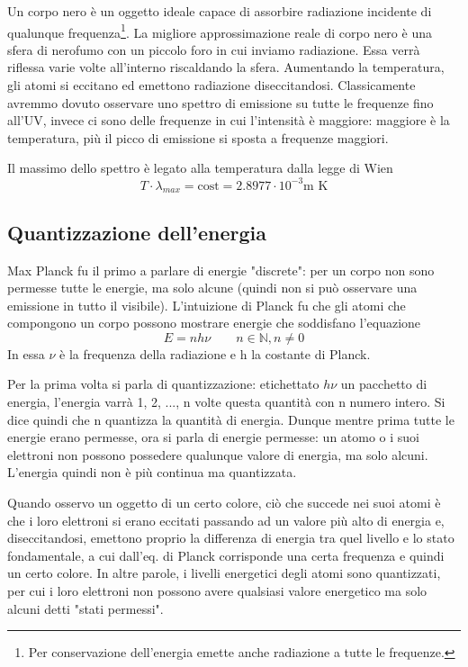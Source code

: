 Un corpo nero è un oggetto ideale capace di assorbire radiazione incidente di qualunque frequenza\footnote{Per conservazione dell'energia emette anche radiazione a tutte le frequenze.}. La migliore approssimazione reale di corpo nero è una sfera di nerofumo con un piccolo foro in cui inviamo radiazione. Essa verrà riflessa varie volte all'interno riscaldando la sfera. Aumentando la temperatura, gli atomi si eccitano ed emettono radiazione diseccitandosi. Classicamente avremmo dovuto osservare uno spettro di emissione su tutte le frequenze fino all'UV, invece ci sono delle frequenze in cui l'intensità è maggiore: maggiore è la temperatura, più il picco di emissione si sposta a frequenze maggiori. 

Il massimo dello spettro è legato alla temperatura dalla legge di Wien 
$$T\cdot\lambda_{max}= \text{cost}= 2.8977\cdot 10^{-3} \text{m K}$$


\subsection{Quantizzazione dell'energia}%
Max Planck fu il primo a parlare di energie "discrete": per un corpo non sono permesse tutte le energie, ma solo alcune (quindi non si può osservare una emissione in tutto il visibile).
L'intuizione di Planck fu che gli atomi che compongono un corpo possono mostrare energie che soddisfano l'equazione
$$E=nh\nu \qquad n\in\mathbb{N},n \neq 0 $$
In essa $\nu$ è la frequenza della radiazione e h la costante di Planck.

Per la prima volta si parla di quantizzazione: etichettato $h\nu$ un pacchetto di energia, l'energia varrà 1, 2, ..., n volte questa quantità con n numero intero. Si dice quindi che n quantizza la quantità di energia.
Dunque mentre prima tutte le energie erano permesse, ora si parla di energie permesse: un atomo o i suoi elettroni non possono possedere qualunque valore di energia, ma solo alcuni. L'energia quindi non è più continua ma quantizzata.

Quando osservo un oggetto di un certo colore, ciò che succede nei suoi atomi è che i loro elettroni si erano eccitati passando ad un valore più alto di energia e, diseccitandosi, emettono proprio la differenza di energia tra quel livello e lo stato fondamentale, a cui dall'eq. di Planck corrisponde una certa frequenza e quindi un certo colore. In altre parole, i livelli energetici degli atomi sono quantizzati, per cui i loro elettroni non possono avere qualsiasi valore energetico ma solo alcuni detti "stati permessi".

